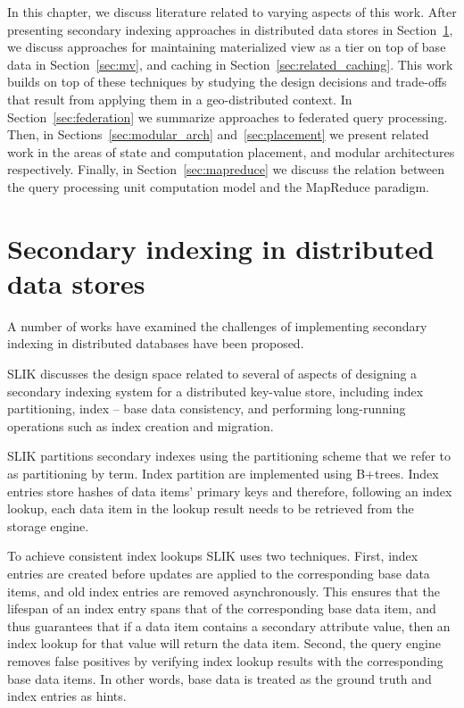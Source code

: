 In this chapter, we discuss literature related to varying aspects of this work.
After presenting secondary indexing approaches in distributed data stores in Section~\ref{sec:secondaryindexing},
we discuss approaches for maintaining materialized view as a tier on top of base data in Section~\ref{sec:mv},
and caching in Section~\ref{sec:related_caching}.
This work builds on top of these techniques by studying the design decisions and trade-offs that result from applying
them in a geo-distributed context.
In Section~\ref{sec:federation} we summarize approaches to federated query processing.
Then, in Sections~\ref{sec:modular_arch} and~\ref{sec:placement}
we present related work in the areas of state and computation placement, and modular architectures respectively.
Finally, in Section~\ref{sec:mapreduce} we discuss the relation between the query processing unit computation model and
the MapReduce paradigm.


\section{Secondary indexing in distributed data stores}
\label{sec:secondaryindexing}

A number of works \cite{kejriwal:slik, dsilva:tworings, tan:diffindex, tang:deferredindexing}
have examined the challenges of implementing secondary indexing in distributed databases have been proposed.

SLIK \cite{kejriwal:slik} discusses the design space related to several of aspects of designing a secondary indexing system
for a distributed key-value store, including index partitioning, index -- base data consistency,
and performing long-running operations such as index creation and migration.

SLIK partitions secondary indexes using the partitioning scheme that we refer to as partitioning by term.
Index partition are implemented using B+trees.
Index entries store hashes of data items' primary keys and therefore,
following an index lookup, each data item in the lookup result needs to be retrieved from the storage engine.

To achieve consistent index lookups SLIK uses two techniques.
First, index entries are created before updates are applied to the corresponding base data items,
and old index entries are removed asynchronously.
This ensures that the lifespan of an index entry spans that of the corresponding base data item,
and thus guarantees that if a data item contains a secondary attribute value, then an index lookup for that value will
return the data item.
Second, the query engine removes false positives by verifying index lookup results with the corresponding base data items.
In other words, base data is treated as the ground truth and index entries as hints.

